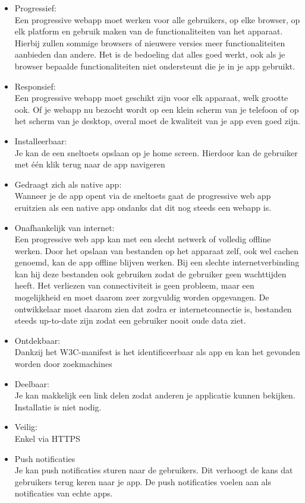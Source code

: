 \begin{itemize}  
	\item Progressief: \\
	Een progressive webapp moet werken voor alle gebruikers, op elke browser, op elk platform en gebruik maken van de functionaliteiten van het apparaat. Hierbij zullen sommige browsers of nieuwere versies meer functionaliteiten aanbieden dan andere. Het is de bedoeling dat alles goed werkt, ook als je browser bepaalde functionaliteiten niet ondersteunt die je in je app gebruikt. \\ 
	\item Responsief: \\
	Een progressive webapp moet geschikt zijn voor elk apparaat, welk grootte ook. Of je webapp nu bezocht wordt op een klein scherm van je telefoon of op het scherm van je desktop, overal moet de kwaliteit van je app even goed zijn. 
	\\
	\item Installeerbaar: \\
	Je kan de een sneltoets opslaan op je home screen. Hierdoor kan de gebruiker met één klik terug naar de app navigeren
	\\
	\item Gedraagt zich als native app: \\
	Wanneer je de app opent via de sneltoets gaat de progressive web app eruitzien als een native app ondanks dat dit nog steeds een webapp is.
	\\
	\item Onafhankelijk van internet: \\
	Een progressive web app kan met een slecht netwerk of volledig offline werken. Door het opslaan van bestanden op het apparaat zelf, ook wel cachen genoemd, kan de app offline blijven werken. Bij een slechte internetverbinding kan hij deze bestanden ook gebruiken zodat de gebruiker geen wachttijden heeft. Het verliezen van connectiviteit is geen probleem, maar een mogelijkheid en moet daarom zeer zorgvuldig worden opgevangen. De ontwikkelaar moet daarom zien dat zodra er internetconnectie is, bestanden steeds up-to-date zijn zodat een gebruiker nooit oude data ziet.
	\\
		\item Ontdekbaar: \\
	Dankzij het W3C-manifest is het identificeerbaar als app en kan het gevonden worden door zoekmachines
	\\
		\item Deelbaar: \\
	Je kan makkelijk een link delen zodat anderen je applicatie kunnen bekijken. Installatie is niet nodig.
	\\
		\item Veilig: \\
	Enkel via HTTPS
	\\
		\item Push notificaties \\
	Je kan push notificaties sturen naar de gebruikers. Dit verhoogt de kans dat gebruikers terug keren naar je app. De push notificaties voelen aan als notificaties van echte apps.
	\\
\end{itemize}
